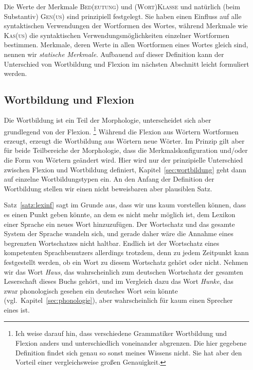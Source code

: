 Die Werte der Merkmale \textsc{Bed(eutung)} und \textsc{(Wort)Klasse} und natürlich (beim Substantiv) \textsc{Gen(us)} sind prinzipiell festgelegt.
Sie haben einen Einfluss auf alle syntaktischen Verwendungen der Wortformen des Wortes, während Merkmale wie \textsc{Kas(us)} die syntaktischen Verwendungsmöglichkeiten einzelner Wortformen bestimmen.
Merkmale, deren Werte in allen Wortformen eines Wortes gleich sind, nennen wir \textit{statische Merkmale}.
Aufbauend auf dieser Definition kann der Unterschied von Wortbildung und Flexion im nächsten Abschnitt leicht formuliert werden.


\subsection{Wortbildung und Flexion}

\label{sec:defwb}

Die Wortbildung ist ein Teil der Morphologie, unterscheidet sich aber grundlegend von der Flexion.%
\footnote{Ich weise darauf hin, dass verschiedene Grammatiker Wortbildung und Flexion anders und unterschiedlich voneinander abgrenzen.
Die hier gegebene Definition findet sich genau so sonst meines Wissens nicht.
Sie hat aber den Vorteil einer vergleichsweise großen Genauigkeit.}
Während die Flexion aus Wörtern Wortformen erzeugt, erzeugt die Wortbildung aus Wörtern neue Wörter.
Im Prinzip gilt aber für beide Teilbereiche der Morphologie, dass die Merkmalskonfiguration und\slash oder die Form von Wörtern geändert wird.
Hier wird nur der prinzipielle Unterschied zwischen Flexion und Wortbildung definiert, Kapitel~\ref{sec:wortbildung} geht dann auf einzelne Wortbildungstypen ein.
An den Anfang der Definition der Wortbildung stellen wir einen nicht beweisbaren aber plausiblen Satz.


Satz~\ref{satz:lexinf} sagt im Grunde aus, dass wir uns kaum vorstellen können, dass es einen Punkt geben könnte, an dem es nicht mehr möglich ist, dem Lexikon einer Sprache ein neues Wort hinzuzufügen.
Der Wortschatz und das gesamte System der Sprache wandeln sich, und gerade daher wäre die Annahme eines begrenzten Wortschatzes nicht haltbar.
Endlich ist der Wortschatz eines kompetenten Sprachbenutzers allerdings trotzdem, denn zu jedem Zeitpunkt kann festgestellt werden, ob ein Wort zu diesem Wortschatz gehört oder nicht.
Nehmen wir das Wort \textit{Haus}, das wahrscheinlich zum deutschen Wortschatz der gesamten Leserschaft dieses Buchs gehört, und im Vergleich dazu das Wort \textit{Hunke}, das zwar phonologisch gesehen ein deutsches Wort sein könnte (vgl.\ Kapitel~\ref{sec:phonologie}), aber wahrscheinlich für kaum einen Sprecher eines ist.

